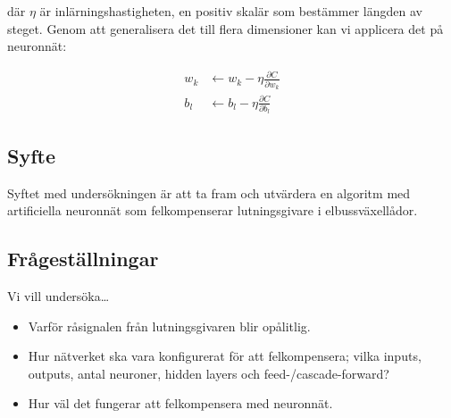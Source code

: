 där $ \eta $ är inlärningshastigheten,
en positiv skalär som bestämmer längden av steget.
Genom att generalisera det till flera dimensioner kan vi
applicera det på neuronnät:

\begin{align}
	w_k &\leftarrow w_k - \eta \frac{\partial C}{\partial w_k} \\
	b_l &\leftarrow b_l - \eta \frac{\partial C}{\partial b_l}
\end{align}

\subsection{Syfte}
Syftet med undersökningen är att ta fram och utvärdera en algoritm med
artificiella neuronnät som felkompenserar lutningsgivare i elbussväxellådor.

\subsection{Frågeställningar}
Vi vill undersöka\ldots
\begin{itemize}
	\item Varför råsignalen från lutningsgivaren blir opålitlig.
	\item Hur nätverket ska vara konfigurerat för att felkompensera; vilka inputs,
		outputs, antal neuroner, hidden layers och feed-/cascade-forward?
	\item Hur väl det fungerar att felkompensera med neuronnät.
\end{itemize}
